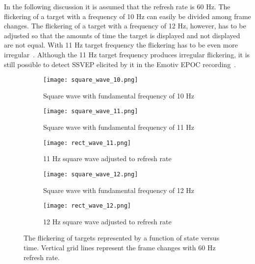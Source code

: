 In the following discussion it is assumed that the refresh rate is 60 Hz. The flickering of a target with a frequency of 10 Hz can easily be divided among frame changes. The flickering of a target with a frequency of 12 Hz, however, has to be adjusted so that the amounts of time the target is displayed and not displayed are not equal. With 11 Hz target frequency the flickering has to be even more irregular~\cite{11hz}. Although the 11 Hz target frequency produces irregular flickering, it is still possible to detect \gls{SSVEP} elicited by it in the Emotiv EPOC recording~\cite{emotiv_11hz}.


\begin{figure}[h!]
	\centering
	\begin{subfigure}{\textwidth}
		\texttt{[image: square\_wave\_10.png]}
		\caption{Square wave with fundamental frequency of 10 Hz}
		\label{fig:square_10}
	\end{subfigure}\vspace{10pt}
	\begin{subfigure}{\textwidth}
		\texttt{[image: square\_wave\_11.png]}
		\caption{Square wave with fundamental frequency of 11 Hz}
		\label{fig:square_11}
	\end{subfigure}\vspace{10pt}
	\begin{subfigure}{\textwidth}
		\texttt{[image: rect\_wave\_11.png]}
		\caption{11 Hz square wave adjusted to refresh rate}
		\label{fig:rect_11}
	\end{subfigure}\vspace{10pt}
	\begin{subfigure}{\textwidth}
		\texttt{[image: square\_wave\_12.png]}
		\caption{Square wave with fundamental frequency of 12 Hz}
		\label{fig:square_12}
	\end{subfigure}\vspace{10pt}
	\begin{subfigure}{\textwidth}
		\texttt{[image: rect\_wave\_12.png]}
		\caption{12 Hz square wave adjusted to refresh rate}
		\label{fig:rect_12}
	\end{subfigure}
	\caption{The flickering of targets represented by a function of state versus time. Vertical grid lines represent the frame changes with 60 Hz refresh rate.}
	\label{fig:square_waves}
\end{figure}

